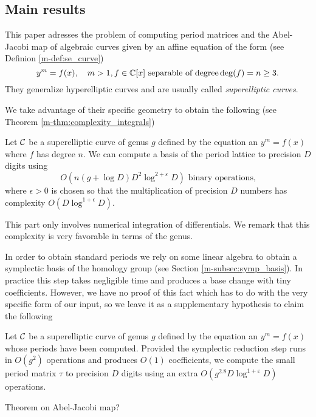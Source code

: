 \documentclass[main.tex]{subfiles}
\begin{document}
  \subsection{Main results}

  This paper adresses the problem of computing period matrices and the
  Abel-Jacobi map of algebraic curves given by an affine equation of the form  (see Definion \ref{m-def:se_curve})
  \begin{equation*}
  y^m = f(x), \quad m > 1, f \in \mathbb{C}[x] \text{ separable of degree} \operatorname{deg}(f) = n \ge 3.
  \end{equation*}
  They generalize
  hyperelliptic curves and are usually called \textit{superelliptic curves}.

  We take advantage of their specific geometry to obtain the following
  (see Theorem \ref{m-thm:complexity_integrals})
  \begin{thm}
      Let $\mathcal{C}$ be a superelliptic curve of genus $g$ defined by the equation an $y^m=f(x)$
      where $f$ has degree $n$.
      We can compute a basis of the period lattice to precision
      $D$ digits using $$O(n(g+\log D)D^2\log^{2+\varepsilon} D) \text{ binary operations,}$$
     where $\epsilon>0$ is chosen so that
      the multiplication of precision $D$ numbers has complexity
      $O(D\log^{1+\epsilon}D)$.
  \end{thm}

  This part only involves numerical integration of differentials. We remark
  that this complexity is very favorable in terms of the genus.

  In order
  to obtain standard periods we rely on some linear algebra to obtain a
  symplectic basis of the homology group (see Section \ref{m-subsec:symp_basis}).
  In practice this step takes negligible time
  and produces a base change with tiny coefficients. However, we have no proof
  of this fact which has to do with the very specific form of our input,
  so we leave it as a supplementary hypothesis to claim the
  following
  \begin{thm}
     Let $\mathcal{C}$ be a superelliptic curve of genus $g$ defined by the equation an $y^m=f(x)$ whose periods
      have been computed.
      Provided the symplectic reduction
      step runs in $O(g^2)$ operations and produces $O(1)$ coefficients,
      we compute the small period matrix $τ$ to precision $D$
      digits using an extra $O(g^{2.8}D\log^{1+\varepsilon}D)$ operations.
  \end{thm}

  \todo Theorem on Abel-Jacobi map?
\end{document}

